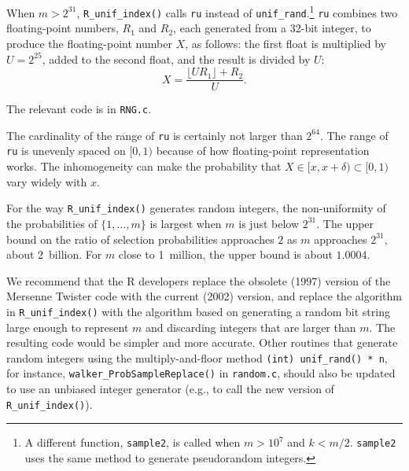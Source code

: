 \documentclass[12pt]{article}
\begin{document}
When $m > 2^{31}$, \texttt{R\_unif\_index()}
calls \texttt{ru} instead of \texttt{unif\_rand}.\footnote{
   A different function, \texttt{sample2}, is called when $m > 10^7$ and $k < m/2$.
\texttt{sample2} uses the same method to generate pseudorandom integers.
}
\texttt{ru} combines two floating-point numbers, $R_1$ and $R_2$, each generated from a 32-bit integer, 
to produce the floating-point number $X$, as follows:
the first float is multiplied by $U = 2^{25}$, added to the second float, and the result is divided by
$U$:
$$ X = \frac{\lfloor U R_1 \rfloor + R_2}{U}.$$

The relevant code is in \texttt{RNG.c}.

The cardinality of the range of \texttt{ru} is certainly not larger than $2^{64}$.
The range of \texttt{ru} is unevenly spaced on $[0, 1)$
because of how floating-point representation works.
The inhomogeneity can make the probability that $X \in [x, x+\delta) \subset [0, 1)$
vary widely with $x$.

For the way \texttt{R\_unif\_index()} generates random integers, the non-uniformity of the probabilities of 
$\{1, \ldots, m\}$ is largest when $m$ is just below $2^{31}$. 
The upper bound on the ratio of selection probabilities approaches $2$ as $m$
approaches $2^{31}$, about 2~billion. 
For $m$ close to 1~million, the upper bound is about $1.0004$.

We recommend that the R developers replace the obsolete (1997) version of the Mersenne Twister code with the current (2002) version, 
and replace the algorithm in \texttt{R\_unif\_index()} with the algorithm based on generating a 
random bit string large enough to represent $m$ and discarding integers that are larger than $m$.
The resulting code would be simpler and more accurate. 
Other routines that generate random integers using the multiply-and-floor method \texttt{(int) unif\_rand() * n}, 
for instance, \texttt{walker\_ProbSampleReplace()} in \texttt{random.c},
should also be updated to use an unbiased integer generator (e.g., to call the new 
version of \texttt{R\_unif\_index()}).



\end{document}
